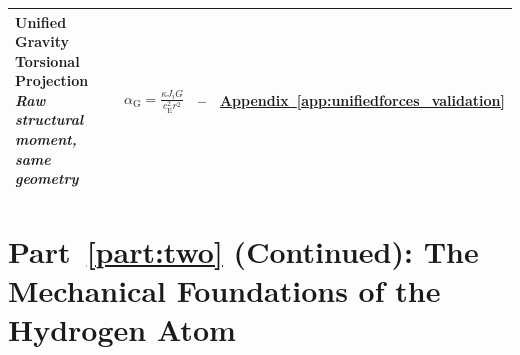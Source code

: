 \begin{longtable}{@{} p{4.5cm} p{6cm} c p{4cm} @{}}
{\raggedright Unified Gravity Torsional Projection \newline \textit{Raw structural moment, same geometry}\par} & {\raggedright $\alpha_{\mathrm{G}} = \frac{\kappa J_i G}{c_{\mathrm{E}}^2 r^2}$\par} & -- & {\raggedright \hyperref[app:unifiedforces_validation]{Appendix~\ref*{app:unifiedforces_validation}}\par} \\

\bottomrule
\end{longtable}

\par\ifdim\dimexpr\pagegoal-\pagetotal\relax<12\baselineskip\newpage\fi
\section*{Part~\ref{part:two} (Continued): The Mechanical Foundations of the Hydrogen Atom}

